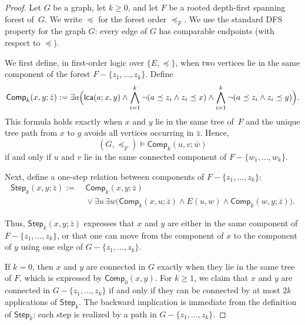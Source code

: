 \documentclass[1p,number,11pt]{elsarticle}
\theoremstyle{plain}
\renewcommand{\geq}{\geqslant}
\begin{document}
\begin{proof} 
Let $G$ be a graph, let $k\geq 0$, and let $F$ be a rooted depth-first spanning forest of~$G$.
%
We write $\preceq$ for the forest
order $\preceq_F$.
We use the standard DFS property for the graph $G$:  every edge of $G$ has comparable endpoints (with respect to  $\preceq$). 

We first define, in first-order logic over $\{E,\preceq\}$, when two vertices
lie in the same component of the forest $F-\{z_1,\dots,z_k\}$. Define
\[
\mathsf{Comp}_k(x,y;\bar z):=
\exists a\Bigl(
   \mathsf{lca}(a;x,y)
   \wedge
   \bigwedge_{i=1}^k
      \neg(a\preceq z_i\wedge z_i\preceq x)
   \wedge
   \bigwedge_{i=1}^k
      \neg(a\preceq z_i\wedge z_i\preceq y)
\Bigr).
\]
This formula holds exactly when $x$ and $y$ lie in the same tree of~$F$ and
the unique tree path from $x$ to $y$ avoids all vertices occurring in
$\bar z$. Hence,
\[
   (G,\preceq_F)\models \mathsf{Comp}_k(u,v;\bar w)
\]
if and only if $u$ and $v$ lie in the same connected component of
$F-\{w_1,\dots,w_k\}$.

Next, define a one-step relation between components of $F-\{z_1,\dots,z_k\}$:
\[
\begin{aligned}
\mathsf{Step}_{k}(x,y;\bar z) :=\ 
& \mathsf{Comp}_{k}(x,y;\bar z) \\
& {}\vee
\exists u\,\exists w\bigl(
   \mathsf{Comp}_{k}(x,u;\bar z)
   \wedge
   E(u,w)
   \wedge
   \mathsf{Comp}_{k}(w,y;\bar z)
\bigr).
\end{aligned}
\]

Thus, $\mathsf{Step}_{k}(x,y;\bar z)$ expresses that $x$ and $y$ are either in the same component of $F-\{z_1,\dots,z_k\}$, or that one can move from the component of $x$ to the component of $y$ using one edge of $G-\{z_1,\dots,z_k\}$.

If $k=0$, then $x$ and $y$ are connected in $G$ exactly when they lie in the same tree of $F$, which is expressed by $\mathsf{Comp}_0(x,y)$.
For $k\geq 1$, we claim that $x$ and $y$ are connected in $G-\{z_1,\ldots,z_k\}$ if and only if they can be connected by at most $2k$ applications of $\mathsf{Step}_k$.
The backward implication is immediate from the definition of $\mathsf{Step}_k$: each step is realized by a path in $G-\{z_1,\ldots,z_k\}$.


\end{proof}
\end{document}
